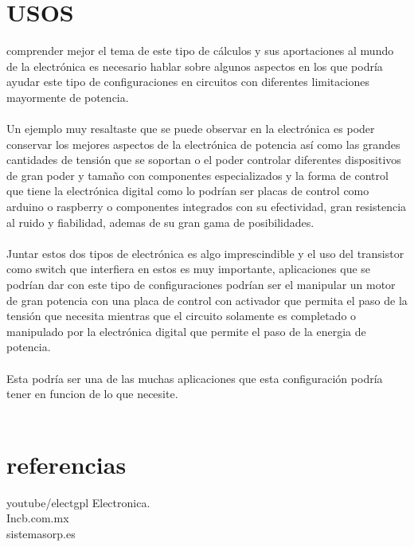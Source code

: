\documentclass[13pt]{article}
\begin{document}
\section{USOS}
comprender mejor el tema de este tipo de cálculos y sus aportaciones al mundo de la electrónica es necesario hablar sobre algunos aspectos en los que podría ayudar este tipo de configuraciones en circuitos con diferentes limitaciones mayormente de potencia.\\\\
Un ejemplo muy resaltaste que se puede observar en la electrónica es poder conservar los mejores aspectos de la electrónica de potencia así como las grandes cantidades de tensión que se soportan o el poder controlar diferentes dispositivos de gran poder y tamaño con componentes especializados y la forma de control que tiene la electrónica digital como lo podrían ser placas de control como arduino o raspberry o componentes integrados con su efectividad, gran resistencia al ruido y fiabilidad, ademas de su gran gama de posibilidades.\\\\
Juntar estos dos tipos de electrónica es algo imprescindible y el uso del transistor como switch que interfiera en estos es muy importante, aplicaciones que se podrían dar con este tipo de configuraciones podrían ser el manipular un motor de gran potencia con una placa de control con activador que permita el paso de la tensión que necesita mientras que el circuito solamente es completado o manipulado por la electrónica digital que permite el paso de la energia de potencia.\\\\
Esta podría ser una de las muchas aplicaciones que esta configuración podría tener en funcion de lo que necesite.\\\\

\section{referencias}
youtube/electgpl Electronica.\\
Incb.com.mx\\
sistemasorp.es\\
\end{document}
